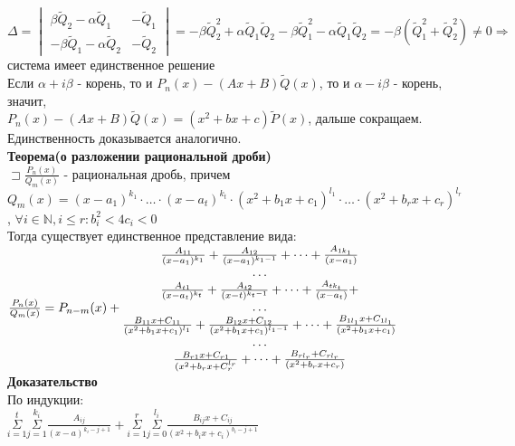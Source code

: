 \documentclass[14pt]{article}
\begin{document}
	$\Delta = \begin{vmatrix}
			\beta \widetilde{Q}_2 - \alpha \widetilde{Q}_1 & -\widetilde{Q}_1 \\
			-\beta \widetilde{Q}_1 - \alpha \widetilde{Q}_2 & -\widetilde{Q}_2
		\end{vmatrix} = -\beta \widetilde{Q}^2_2 + \alpha \widetilde{Q}_1 \widetilde{Q}_2 - \beta \widetilde{Q}^2_1 - \alpha \widetilde{Q}_1\widetilde{Q}_2 = -\beta(\widetilde{Q}^2_1 + \widetilde{Q}^2_2) \neq 0 \Rightarrow$ система имеет единственное решение \\
	Если $\alpha + i \beta$ - корень, то и $P_n(x) - (Ax+B)\widetilde{Q}(x)$, то и $\alpha - i \beta$ - корень, значит,\\ $P_n(x) - (Ax+B)\widetilde{Q}(x) = (x^2 + bx + c)\widetilde{P}(x)$, дальше сокращаем. Единственность доказывается аналогично. \\
	\textbf{Теорема(о разложении рациональной дроби)} \\
	$\sqsupset \frac{P_n(x)}{Q_m(x)}$ - рациональная дробь, причем $Q_m(x) = (x-a_1)^{k_1} \cdot \dots \cdot (x-a_t)^{k_t} \cdot (x^2 + b_1x + c_1)^{l_1} \cdot \dots \cdot (x^2 + b_rx + c_r)^{l_r}$, $\forall i \in \mathbb{N}, i\leqslant r: b^2_i < 4c_i < 0$ \\
	Тогда существует единственное представление вида: \\
	$\frac{P_n(x)}{Q_m(x)}=P_{n-m}(x) + \\
	\begin{matrix}
		\frac{A_{11}}{(x-a_1)^{k_1}} + \frac{A_{12}}{(x-a_1)^{k_1-1}} + \dots + \frac{A_{1k_1}}{(x-a_1)} \\
		\dots \\
		\frac{A_{t1}}{(x-a_t)^{k_t}} + \frac{A_{t2}}{(x-t)^{k_t-1}} + \dots + \frac{A_{tk_t}}{(x-a_t)} + \\
		\dots \\
		\frac{B_{11}x+C_{11}}{(x^2+b_1x+c_1)^{l_1}}+\frac{B_{12}x+C_{12}}{(x^2+b_1x+c_1)^{l_1-1}} + \dots + \frac{B_{1l_1}x+C_{1l_1}}{(x^2+b_1x+c_1)} \\
		\dots \\
		\frac{B_{r1}x+C_{r1}}{(x^2+b_{r}x+C_{r}^{l_r}} + \dots + \frac{B_{rl_r}+C_{rl_r}}{(x^2+b_rx+c_r)}
	\end{matrix}$ \\
	\textbf{Доказательство} \\
	По индукции: \\
	$\underset{i=1}{\overset{t}{\Sigma}}\underset{j=1}{\overset{k_i}{\Sigma}}\frac{A_{ij}}{(x-a)^{k_i-j+1}} + \underset{i=1}{\overset{r}{\Sigma}}\underset{j=0}{\overset{l_i}{\Sigma}}\frac{B_{ij}x+C_{ij}}{(x^2+b_ix+c_i)^{b_i-j+1}}$ \\
\end{document}
